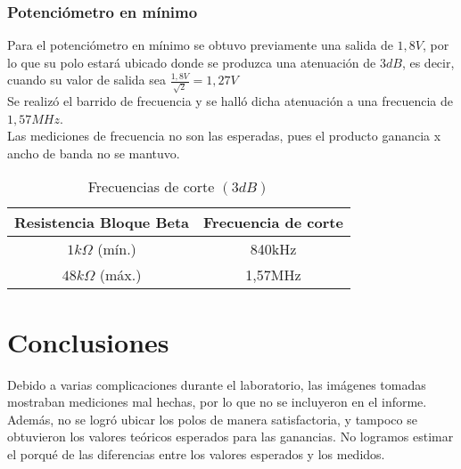 \documentclass[letterpaper, 10 pt, conference]{ieeeconf}  %
\begin{document}
\subsubsection{Potenciómetro en mínimo}
Para el potenciómetro en mínimo se obtuvo previamente una salida de $1,8V$, por lo que su polo estará ubicado donde se produzca una atenuación de $3dB$, es decir, cuando su valor de salida sea $\frac{1,8V}{\sqrt{2}} = 1,27V$\\
Se realizó el barrido de frecuencia y se halló dicha atenuación a una frecuencia de $1,57MHz$.\\[em]

Las mediciones de frecuencia no son las esperadas, pues el producto ganancia x ancho de banda no se mantuvo.

\begin{table}[h]
\begin{center}
\begin{tabular}{|c||c|}
\hline
Resistencia Bloque Beta & Frecuencia de corte\\
\hline
$1k\Omega$ (mín.) & 840kHz\\
\hline
$48k\Omega$ (máx.) & 1,57MHz\\
\hline
\end{tabular}
\end{center}
\caption{Frecuencias de corte $(3dB)$}
\label{tab:simple}
\end{table}

\section{Conclusiones}

Debido a varias complicaciones durante el laboratorio, las imágenes tomadas mostraban mediciones mal hechas, por lo que no se incluyeron en el informe. Además, no se logró ubicar los polos de manera satisfactoria, y tampoco se obtuvieron los valores teóricos esperados para las ganancias. No logramos estimar el porqué de las diferencias entre los valores esperados y los medidos.
 

\addtolength{\textheight}{-12cm}   %
\end{document}
